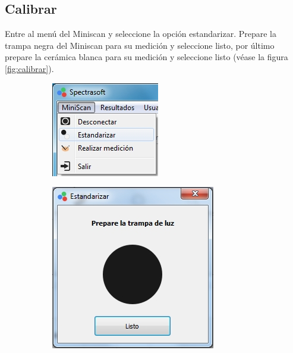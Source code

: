 	\subsection*{Calibrar}
		Entre al men\'{u} del Miniscan y seleccione la opci\'{o}n estandarizar. Prepare la trampa negra del Miniscan para su medici\'{o}n y seleccione listo, por \'{u}ltimo prepare la cer\'{a}mica blanca para su medici\'{o}n y seleccione listo (v\'{e}ase la figura \ref{fig:calibrar}).
	
\begin{figure}[H]
\centering
\begin{subfigure}{.33\textwidth}
  \centering
  \includegraphics[width=.9\linewidth]{./img/estandarizar.jpg}
\end{subfigure}%
\centering
\begin{subfigure}{.33\textwidth}
  \centering
  \includegraphics[width=.9\linewidth]{./img/estandarizar-negro.jpg}

\end{subfigure}
\end{figure}
